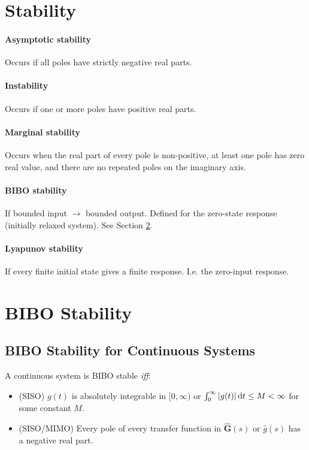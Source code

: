 \documentclass[a4paper]{article}
\newcommand{\M}[1]{\bm{#1}}
\begin{document}
\section{Stability}
\paragraph{Asymptotic stability} Occurs if all poles have strictly negative real parts.
\paragraph{Instability} Occurs if one or more poles have positive real parts.
\paragraph{Marginal stability} Occurs when the real part of every pole is non-positive, at least one pole has zero real value, and there are no repeated poles on the imaginary axis.
\paragraph{BIBO stability} If bounded input $\rightarrow$ bounded output. Defined for the zero-state response (initially relaxed system). See Section \ref{sec:bibo}.
\paragraph{Lyapunov stability} If every finite initial state gives a finite response. I.e. the zero-input response.



\section{BIBO Stability}\label{sec:bibo}
\subsection{BIBO Stability for Continuous Systems}
A continuous system is BIBO stable \emph{iff}:
\begin{itemize}
\item	(SISO) $g(t)$ is absolutely integrable in $[0, \infty)$ \quad or \quad $\int_{0}^{\infty} |g(t)| \dif t \leq M < \infty $ for some constant $M$.
\item	(SISO/MIMO) Every pole of every transfer function in $\M{\hat{G}}(s)$ or $\hat{g}(s)$ has a negative real part.
\end{itemize}
\end{document}
